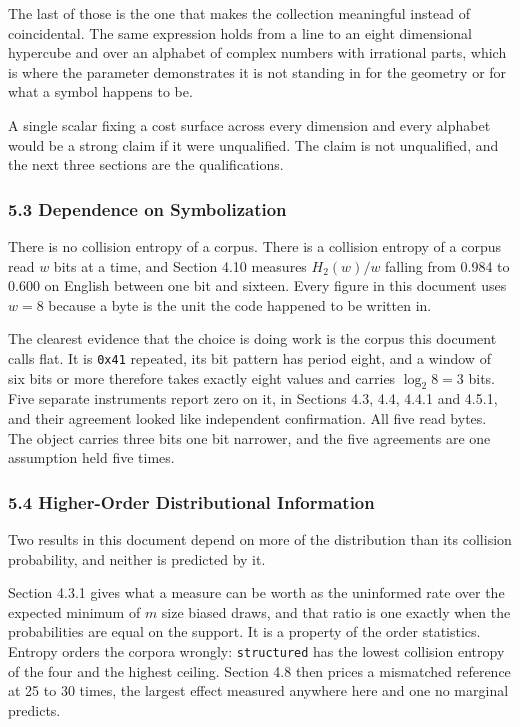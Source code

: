 The last of those is the one that makes the collection meaningful instead of coincidental. The same expression holds from a line to an eight dimensional hypercube and over an alphabet of complex numbers with irrational parts, which is where the parameter demonstrates it is not standing in for the geometry or for what a symbol happens to be.

A single scalar fixing a cost surface across every dimension and every alphabet would be a strong claim if it were unqualified. The claim is not unqualified, and the next three sections are the qualifications.

\subsubsection{5.3 Dependence on Symbolization}

There is no collision entropy of a corpus. There is a collision entropy of a corpus read \(w\) bits at a time, and Section 4.10 measures \(H_2(w)/w\) falling from 0.984 to 0.600 on English between one bit and sixteen. Every figure in this document uses \(w = 8\) because a byte is the unit the code happened to be written in.

The clearest evidence that the choice is doing work is the corpus this document calls flat. It is \texttt{0x41} repeated, its bit pattern has period eight, and a window of six bits or more therefore takes exactly eight values and carries \(\log_2 8 = 3\) bits. Five separate instruments report zero on it, in Sections 4.3, 4.4, 4.4.1 and 4.5.1, and their agreement looked like independent confirmation. All five read bytes. The object carries three bits one bit narrower, and the five agreements are one assumption held five times.

\subsubsection{5.4 Higher-Order Distributional Information}

Two results in this document depend on more of the distribution than its collision probability, and neither is predicted by it.

Section 4.3.1 gives what a measure can be worth as the uninformed rate over the expected minimum of \(m\) size biased draws, and that ratio is one exactly when the probabilities are equal on the support. It is a property of the order statistics. Entropy orders the corpora wrongly: \texttt{structured} has the lowest collision entropy of the four and the highest ceiling. Section 4.8 then prices a mismatched reference at 25 to 30 times, the largest effect measured anywhere here and one no marginal predicts.

